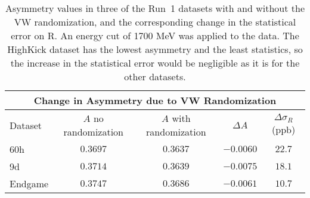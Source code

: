 \begin{table}[]
\centering
\small
\setlength\tabcolsep{10pt}
\renewcommand{\arraystretch}{1.2}
\begin{tabular*}{1\linewidth}{@{\extracolsep{\fill}}lcccc}
  \hline
    \multicolumn{5}{c}{\textbf{Change in Asymmetry due to VW Randomization}} \\
  \hline\hline
    Dataset & $A$ no randomization & $A$ with randomization & $\Delta A$ & $\Delta \sigma_{R}$ (ppb) \\
  \hline
    60h & $0.3697$ & $0.3637$ & $-0.0060$ & $22.7$ \\
    9d & $0.3714$ & $0.3639$ & $-0.0075$ & $18.1$ \\
    Endgame & $0.3747$ & $0.3686$ & $-0.0061$ & $10.7$ \\
  \hline
\end{tabular*}
\caption[Asymmetry values in Run~1 datasets with VW time randomization]{Asymmetry values in three of the Run~1 datasets with and without the VW randomization, and the corresponding change in the statistical error on R. An energy cut of 1700 MeV was applied to the data. The HighKick dataset has the lowest asymmetry and the least statistics, so the increase in the statistical error would be negligible as it is for the other datasets.}
\label{tab:A_change}
\end{table}



